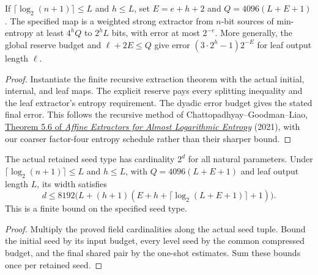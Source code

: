 \begin{theorem}
  \label{thm:lowerbounds-algebraic-scheduled-extractor}
  \leanok
  If $\lceil\log_2(n+1)\rceil\le L$ and $h\le L$, set
  $E=e+h+2$ and $Q=4096(L+E+1)$. The specified map is a weighted strong
  extractor from $n$-bit sources of min-entropy at least $4^hQ$ to
  $2^hL$ bits, with error at most $2^{-e}$. More generally, the global
  reserve budget and $\ell+2E\le Q$ give error
  $(3\cdot2^h-1)2^{-E}$ for leaf output length $\ell$.
\end{theorem}
\begin{proof}
  \leanok
  Instantiate the finite recursive extraction theorem with the actual
  initial, internal, and leaf maps. The explicit reserve pays every
  splitting inequality and the leaf extractor's entropy requirement.
  The dyadic error budget gives the stated final error. This follows the
  recursive method of Chattopadhyay--Goodman--Liao,
  \href{https://eccc.weizmann.ac.il/report/2021/075/}{Theorem 5.6 of
  \emph{Affine Extractors for Almost Logarithmic Entropy}} (2021), with our
  coarser factor-four entropy schedule rather than their sharper bound.
\end{proof}

\begin{theorem}
  \label{thm:lowerbounds-algebraic-scheduled-seeds}
  \leanok
  The actual retained seed type has cardinality $2^d$ for all natural
  parameters. Under $\lceil\log_2(n+1)\rceil\le L$ and $h\le L$, with
  $Q=4096(L+E+1)$ and leaf output length $L$, its width satisfies
  \[
    d\le8192\bigl(L+(h+1)(E+h+
      \lceil\log_2(L+E+1)\rceil+1)\bigr).
  \]
  This is a finite bound on the specified seed type.
\end{theorem}
\begin{proof}
  \leanok
  Multiply the proved field cardinalities along the actual seed tuple.
  Bound the initial seed by its input budget, every level seed by the
  common compressed budget, and the final shared pair by the one-shot
  estimates. Sum these bounds once per retained seed.
\end{proof}

